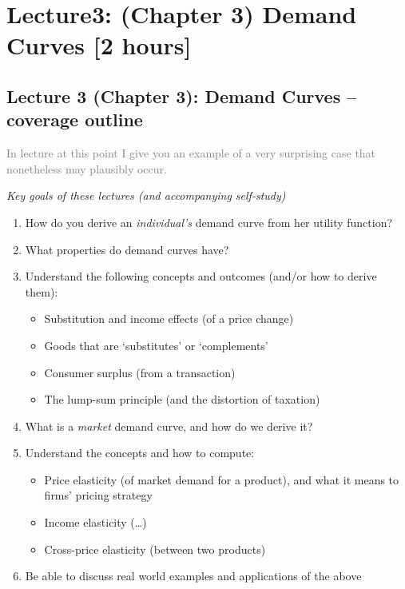 \documentclass[]{article}
\providecommand{\tightlist}{%
  \setlength{\itemsep}{0pt}\setlength{\parskip}{0pt}}
\begin{document}
\hypertarget{lecture3-chapter-3-demand-curves-2-hours}{%
\section{Lecture3: (Chapter 3) Demand Curves {[}2 hours{]}}\label{lecture3-chapter-3-demand-curves-2-hours}}

\hypertarget{lecture-3-chapter-3-demand-curves-coverage-outline}{%
\subsection{Lecture 3 (Chapter 3): Demand Curves -- coverage outline}\label{lecture-3-chapter-3-demand-curves-coverage-outline}}

\textcolor{gray}{In lecture at this point I give you an example of a very surprising case that nonetheless may plausibly occur.}

\emph{Key goals of these lectures (and accompanying self-study)}

\begin{enumerate}
\def\labelenumi{\arabic{enumi}.}
\tightlist
\item
  How do you derive an \emph{individual's} demand curve from her utility function?
\item
  What properties do demand curves have?
\item
  Understand the following concepts and outcomes (and/or how to derive them):

  \begin{itemize}
  \tightlist
  \item
    Substitution and income effects (of a price change)
  \item
    Goods that are `substitutes' or `complements'
  \item
    Consumer surplus (from a transaction)
  \item
    The lump-sum principle (and the distortion of taxation)
  \end{itemize}
\item
  What is a \emph{market} demand curve, and how do we derive it?
\item
  Understand the concepts and how to compute:

  \begin{itemize}
  \tightlist
  \item
    Price elasticity (of market demand for a product), and what it means to firms' pricing strategy
  \item
    Income elasticity (\ldots{})
  \item
    Cross-price elasticity (between two products)
  \end{itemize}
\item
  Be able to discuss real world examples and applications of the above
\end{enumerate}
\end{document}
